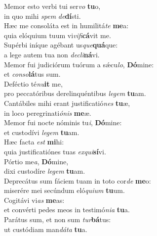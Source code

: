 \oddverse Memor esto verbi tui ser\textit{vo} \textbf{tu}o,~\*\\
\oddverse in quo mihi \textit{spem} \textit{de}\textbf{dí}sti.\\
\evenverse Hæc me consoláta est in humilitá\textit{te} \textbf{me}a:~\*\\
\evenverse quia elóquium tuum vi\textit{vi}\textit{fi}\textbf{cá}vit me.\\
\oddverse Supérbi iníque agébant us\textit{que}\textbf{quá}que:~\*\\
\oddverse a lege autem tua non \textit{de}\textit{cli}\textbf{ná}vi.\\
\evenverse Memor fui judiciórum tuórum a sǽcu\textit{lo}, \textbf{Dó}mine:~\*\\
\evenverse et \textit{con}\textit{so}\textbf{lá}tus sum.\\
\oddverse Deféctio té\textit{nu}\textbf{it} me,~\*\\
\oddverse pro peccatóribus derelinquéntibus \textit{le}\textit{gem} \textbf{tu}am.\\
\evenverse Cantábiles mihi erant justificatió\textit{nes} \textbf{tu}æ,~\*\\
\evenverse in loco peregrinati\textit{ó}\textit{nis} \textbf{me}æ.\\
\oddverse Memor fui nocte nóminis tu\textit{i}, \textbf{Dó}mine:~\*\\
\oddverse et custodívi \textit{le}\textit{gem} \textbf{tu}am.\\
\evenverse Hæc facta \textit{est} \textbf{mi}hi:~\*\\
\evenverse quia justificatiónes tuas \textit{ex}\textit{qui}\textbf{sí}vi.\\
\oddverse Pórtio me\textit{a}, \textbf{Dó}mine,~\*\\
\oddverse dixi custodíre \textit{le}\textit{gem} \textbf{tu}am.\\
\evenverse Deprecátus sum fáciem tuam in toto cor\textit{de} \textbf{me}o:~\*\\
\evenverse miserére mei secúndum eló\textit{qui}\textit{um} \textbf{tu}um.\\
\oddverse Cogitávi vi\textit{as} \textbf{me}as:~\*\\
\oddverse et convérti pedes meos in testimó\textit{ni}\textit{a} \textbf{tu}a.\\
\evenverse Parátus sum, et non sum \textit{tur}\textbf{bá}tus:~\*\\
\evenverse ut custódiam man\textit{dá}\textit{ta} \textbf{tu}a.\\

